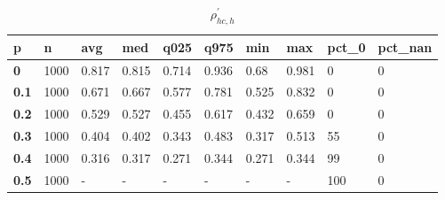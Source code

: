 \begin{table}[h]
 \centering 
\footnotesize
\caption{$\rho_{hc,h}^\prime $}
\label{tab:alphahch}
\begin{tabular}[h]{|l|l|l|l|l|l|l|l|l|l|
    } \hline
\textbf{ p} & \textbf{ n} & \textbf{ avg} & \textbf{ med} & \textbf{ q025} & \textbf{ q975} & \textbf{ min} & \textbf{ max} & \textbf{ pct\_0} & \textbf{ pct\_nan}
    \\ \hline
  \textbf{  0} & 1000 & 0.817 & 0.815 & 0.714 & 0.936 &  0.68 & 0.981 &   0 & 0
    \\ \hline
  \textbf{0.1} & 1000 & 0.671 & 0.667 & 0.577 & 0.781 & 0.525 & 0.832 &   0 & 0
    \\ \hline
  \textbf{0.2} & 1000 & 0.529 & 0.527 & 0.455 & 0.617 & 0.432 & 0.659 &   0 & 0
    \\ \hline
  \textbf{0.3} & 1000 & 0.404 & 0.402 & 0.343 & 0.483 & 0.317 & 0.513 &  55 & 0
    \\ \hline
  \textbf{0.4} & 1000 & 0.316 & 0.317 & 0.271 & 0.344 & 0.271 & 0.344 &  99 & 0
    \\ \hline
  \textbf{0.5} & 1000 & - & - & - & - & - & - & 100 & 0
    \\ \hline
 \end{tabular}
 \end{table}

